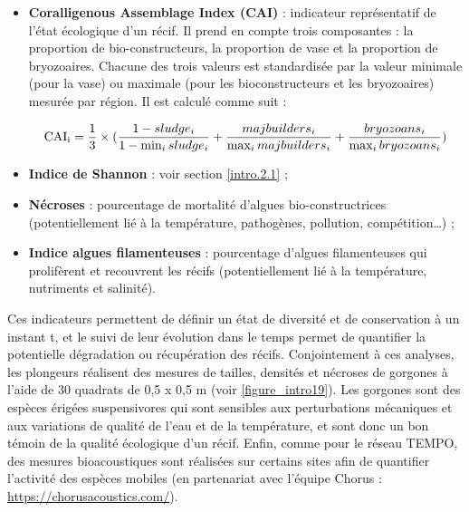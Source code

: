 \begin{itemize}
    \item \textbf{Coralligenous Assemblage Index (CAI)} \citep{deter_preliminary_2012} : indicateur représentatif de l’état écologique d’un récif. Il prend en compte trois composantes : la proportion de bio-constructeurs, la proportion de vase et la proportion de bryozoaires. Chacune des trois valeurs est standardisée par la valeur minimale (pour la vase) ou maximale (pour les bioconstructeurs et les bryozoaires) mesurée par région. Il est calculé comme suit :
    
    \begin{equation}
        \text{CAI\textsubscript{i}}=\frac{1}{3}\times(\frac{1-sludge_i}{1-\min_{i}sludge_i}+\frac{majbuilders_i}{\max_{i}majbuilders_i}+\frac{bryozoans_i}{\max_{i}bryozoans_i})
        \label{eqintro.2}
    \end{equation}
    
    \item \textbf{Indice de Shannon} \citep{magurran_measuring_2004} : voir section \ref{intro.2.1} ;
    
    \item \textbf{Nécroses} : pourcentage de mortalité d’algues bio-constructrices (potentiellement lié à la température, pathogènes, pollution, compétition…) ;
    
    \item \textbf{Indice algues filamenteuses} : pourcentage d’algues filamenteuses qui prolifèrent et recouvrent les récifs (potentiellement lié à la température, nutriments et salinité).

\end{itemize}

Ces indicateurs permettent de définir un état de diversité et de conservation à un instant t, et le suivi de leur évolution dans le temps permet de quantifier la potentielle dégradation ou récupération des récifs. Conjointement à ces analyses, les plongeurs réalisent des mesures de tailles, densités et nécroses de gorgones à l’aide de 30 quadrats de 0,5 x 0,5 m (voir \autoref{figure_intro19}). Les gorgones sont des espèces érigées suspensivores qui sont sensibles aux perturbations mécaniques et aux variations de qualité de l’eau et de la température, et sont donc un bon témoin de la qualité écologique d’un récif. Enfin, comme pour le réseau TEMPO, des mesures bioacoustiques sont réalisées sur certains sites afin de quantifier l’activité des espèces mobiles (en partenariat avec l’équipe Chorus : \href{https://chorusacoustics.com/}{https://chorusacoustics.com/}).

